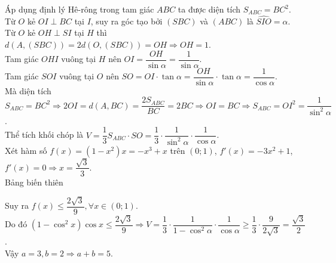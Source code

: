 \begin{ex}
{\begin{center}
		\end{center}
		Áp dụng định lý Hê-rông trong tam giác $ ABC$ ta được diện tích $S_{ABC}=B{C^2}$.\\
		Từ $O$ kẻ $OI\perp BC$ tại $I$, suy ra góc tạo bởi $\left(SBC\right)$ và $\left(ABC\right)$ là $\widehat{SIO}=\alpha$.\\
		Từ $ O$ kẻ $ OH\perp SI$ tại $H$ thì $d\left(A,\left(SBC\right)\right)=2d\left(O,\left(SBC\right)\right)=OH\Rightarrow OH=1$.\\
		Tam giác $OHI$ vuông tại $ H$ nên $OI=\dfrac{OH}{\sin\alpha}=\dfrac{1}{\sin\alpha}$.\\
		Tam giác $SOI$ vuông tại $ O$ nên $SO=OI\cdot\tan\alpha=\dfrac{OH}{\sin\alpha}\cdot\tan\alpha=\dfrac{1}{\cos\alpha}$.\\
		Mà diện tích\\
		$S_{ABC}=BC^2\Rightarrow 2OI=d\left(A,BC\right)=\dfrac{2S_{ABC}}{BC}=2BC\Rightarrow OI=BC\Rightarrow{S_{ABC}}=O{I^2}=\dfrac{1}{\sin^2\alpha}$.\\
		Thể tích khối chóp là $ V=\dfrac{1}{3}{S_{ABC}}\cdot SO=\dfrac{1}{3}\cdot\dfrac{1}{\sin^2\alpha}\cdot\dfrac{1}{\cos\alpha}$.\\
		Xét hàm số $ f(x)=\left(1-x^2\right)x=-x^3+x$ trên $\left(0;1\right)$, $f'(x)=-3x^2+1$, $f'(x)=0\Rightarrow x=\dfrac{\sqrt{3}}{3}$.\\
		Bảng biến thiên
		\begin{center}
		\end{center}
		Suy ra $f(x)\le\dfrac{2\sqrt{3}}{9},\forall x\in\left(0;1\right)$.\\
		Do đó $\left(1-\cos^2x\right)\cos x\le\dfrac{2\sqrt{3}}{9}\Rightarrow V=\dfrac{1}{3}\cdot\dfrac{1}{1-\cos^2\alpha}\cdot\dfrac{1}{\cos\alpha}\ge\dfrac{1}{3}\cdot\dfrac{9}{2\sqrt{3}}=\dfrac{\sqrt{3}}{2}$.\\
		Vậy $ a=3,b=2\Rightarrow a+b=5$.
	}
\end{ex}

